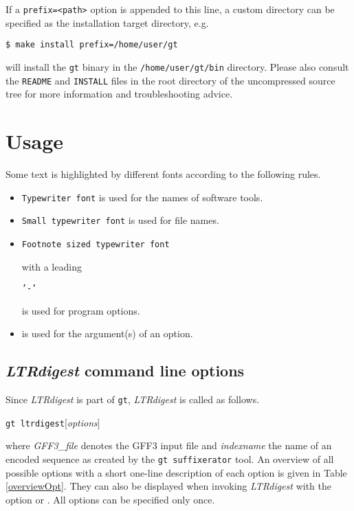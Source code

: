 \documentclass[12pt,titlepage]{article}
\newcommand{\LTRdigest}{\textit{LTRdigest}\xspace}
\newcommand{\GtLTRdigest}{\texttt{gt ltrdigest}\xspace}
\newcommand{\Gt}{\texttt{gt}\xspace}
\newcommand{\Gtsuffixerator}{\texttt{gt suffixerator}\xspace}
\begin{document}
If a \texttt{prefix=<path>} option is appended to this line, a custom directory can be specified as the installation target directory, e.g.

\begin{verbatim}
$ make install prefix=/home/user/gt
\end{verbatim}%

will install the \Gt binary in the \texttt{/home/user/gt/bin} directory.
Please also consult the \texttt{README} and \texttt{INSTALL} files in the root directory of the uncompressed source tree for more information and troubleshooting advice.

\section{Usage} \label{Usage}

Some text is highlighted by different fonts according to the following rules.

\begin{itemize}
\item \texttt{Typewriter font} is used for the names of software tools.
\item \texttt{\small{Small typewriter font}} is used for file names.
\item \begin{footnotesize}\texttt{Footnote sized typewriter font}
      \end{footnotesize} with a leading
      \begin{footnotesize}\texttt{'-'}\end{footnotesize}
      is used for program options.
\item {} is used for the argument(s) of an
      option.
\end{itemize}

\subsection{\LTRdigest command line options}

Since \LTRdigest is part of \Gt, \LTRdigest is called as follows.

\GtLTRdigest  $[$\emph{options}$]$  

where \emph{GFF3\_file} denotes the GFF3 input file and \emph{indexname} the name of an encoded sequence as created by the \Gtsuffixerator tool.
An overview of all possible options with a short one-line description of
each option is given in Table \ref{overviewOpt}. They can also be displayed when invoking \LTRdigest with the option  or .
All options can be specified only once.
\end{document}
